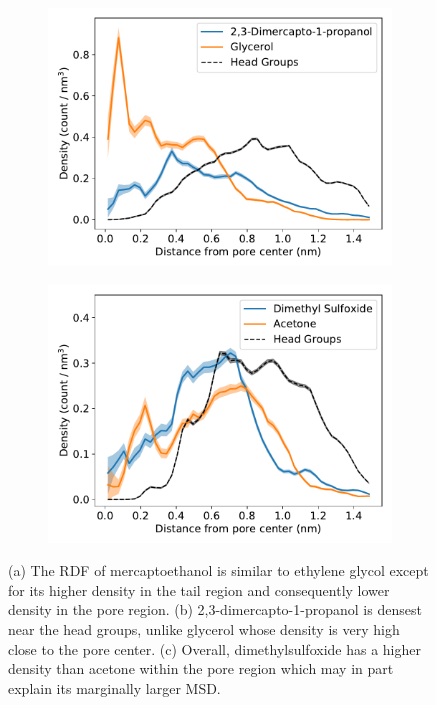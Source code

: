 \documentclass[journal=jpcbfk,manuscript=article]{achemso}
\begin{document}
\begin{figure}[!htb]
\begin{subfigure}{0.45\linewidth}
  \includegraphics[width=\textwidth]{thiol_comparison_DMP.pdf}
  \caption{}\label{fig:DMP_GLY_comparison}
  \end{subfigure}
  \begin{subfigure}{0.45\linewidth}
  \includegraphics[width=\textwidth]{thiol_comparison_DMS.pdf}
  \caption{}\label{fig:DMP_GLY_comparison}
  \end{subfigure}
  \caption{(a) The RDF of mercaptoethanol is similar to ethylene glycol except 
  for its higher density in the tail region and consequently lower density in the
  pore region. (b) 2,3-dimercapto-1-propanol is densest near the head groups, 
  unlike glycerol whose density is very high close to the pore center. 
  (c) Overall, dimethylsulfoxide has a higher density than acetone within the 
  pore region which may in part explain its marginally larger MSD.}\label{fig:sulfur_analog_rdfs}
  \end{figure}
  
\end{document}
